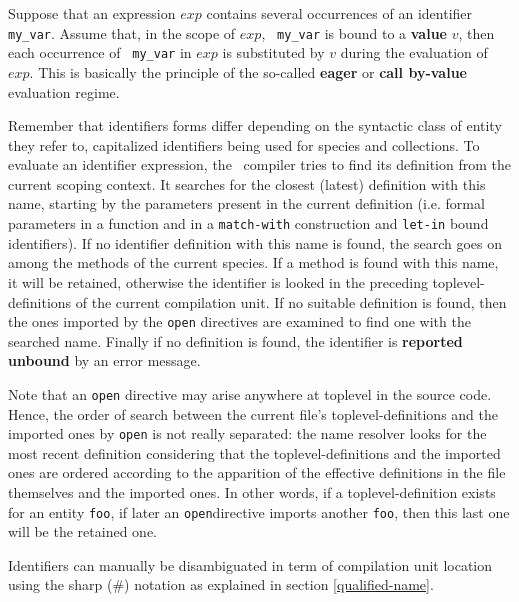Suppose that an expression $exp$ contains several occurrences of an
identifier {\tt my\_var}.  Assume that, in the scope of $exp$, {\tt
  my\_var} is bound to a {\bf value} $v$, then each occurrence of {\tt
  my\_var} in $exp$ is substituted by $v$ during the evaluation of
$exp$. This is basically the principle of the so-called {\bf eager} or
{\bf call by-value} evaluation regime.


\medskip
{}
Remember that identifiers forms differ depending on the syntactic
class of entity they refer to, capitalized identifiers being used for
species and collections.  To evaluate an identifier expression, the
\focal\ compiler tries to find its definition from the current scoping
context.   
 It searches for the closest (latest) definition with this name,
starting by the parameters present in the current definition
(i.e. formal parameters in a function and in a {\tt match-with}
construction and {\tt let-in} bound identifiers). If no identifier
definition with this name is found, the search goes on among the
methods of the current species. If a method is found with this name,
it will be retained, otherwise the identifier is looked in the
preceding toplevel-definitions of the current compilation unit.
\label{identifier-scoping-and-open}
 If no suitable definition is found, then the
ones imported by the {\tt open} directives are examined to find one
with the searched name. Finally if no definition is found, the
identifier is {\bf reported unbound} by an error message.

 Note that an
{\tt open} directive may arise anywhere at toplevel in the source
code. Hence, the order of search between the current file's
toplevel-definitions and the imported ones by {\tt open} is not really
separated: the name resolver looks for the most recent definition
considering that the toplevel-definitions and the imported ones are
ordered according to the apparition of the effective definitions in
the file themselves and the imported ones. In other words, if a
toplevel-definition exists for an entity {\tt foo}, if later an
{\tt open}directive imports another {\tt foo}, then this last one
will be the retained one.

\medskip

\medskip
{}

Identifiers can manually be disambiguated in term of compilation unit
location using the sharp (\#) notation as explained in section
\ref{qualified-name}.

